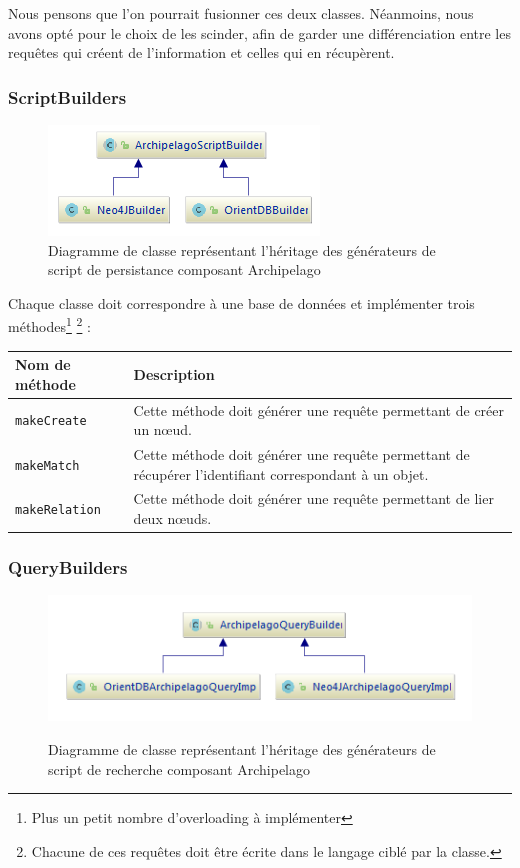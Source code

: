 \documentclass[a4paper,fleqn,12pt,oneside]{report}
\begin{document}
Nous pensons que l'on pourrait fusionner ces deux classes. Néanmoins, nous avons opté pour le choix de les scinder, afin de garder une différenciation entre les requêtes qui créent de l'information et celles qui en récupèrent.

\newpage
{}
\subsubsection{ScriptBuilders}


\begin{figure}[!ht]
\centering
\includegraphics[scale=1.5]{figures/scriptBuilders.png}
\caption{Diagramme de classe représentant l'héritage des générateurs de script de persistance composant Archipelago}
\label{fig:ScriptQuery}
\end{figure}

Chaque classe doit correspondre à une base de données et implémenter trois méthodes\footnote{Plus un petit nombre d'overloading à implémenter} \footnote{Chacune de ces requêtes doit être écrite dans le langage ciblé par la classe.} :

\begin{tabular}[c]{|l|M{12cm}|}

\hline
\textbf{Nom de méthode} & \textbf{Description}  \tabularnewline
\hline
\texttt{makeCreate} &  Cette méthode doit générer une requête permettant de créer un nœud. \tabularnewline
\hline
\texttt{makeMatch} & Cette méthode doit générer une requête permettant de récupérer l'identifiant correspondant à un objet. \tabularnewline
\hline
\texttt{makeRelation} &  Cette méthode doit générer une requête permettant de lier deux nœuds.  \tabularnewline
\hline

\end{tabular}
\newpage
{}
\subsubsection{QueryBuilders}

\begin{figure}[!ht]
\centering
\includegraphics[scale=1.5]{figures/queryBuilders.png}
\label{fig:QueryBuilders}
\caption{Diagramme de classe représentant l'héritage des générateurs de script de recherche composant Archipelago}
\end{figure}
\end{document}
